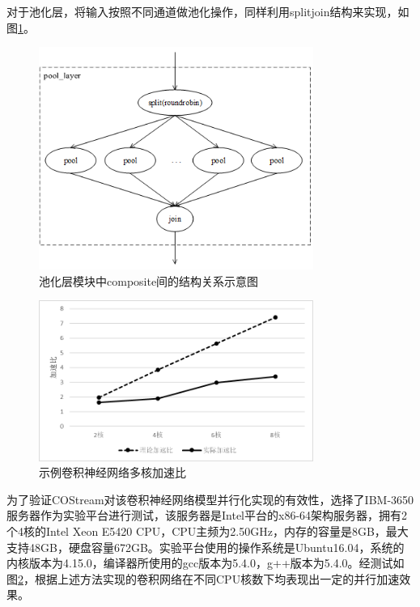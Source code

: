 对于池化层，将输入按照不同通道做池化操作，同样利用splitjoin结构来实现，如图\ref{fig:cnn_pooling_layer}。

\begin{figure}[!t]
\centering
\includegraphics[width=0.8\textwidth]{../img/Chap_Application/Yu/cnn_pooling_layer.png}
\caption{池化层模块中composite间的结构关系示意图}
\label{fig:cnn_pooling_layer}
\end{figure}

\begin{figure}[!t]
  \centering
  \includegraphics[width=0.8\textwidth]{../img/Chap_Application/Yu/cnn_speedup.png}
  \caption{示例卷积神经网络多核加速比}
  \label{fig:cnn_speedup}
\end{figure}

为了验证COStream对该卷积神经网络模型并行化实现的有效性，选择了IBM-3650服务器作为实验平台进行测试，该服务器是Intel平台的x86-64架构服务器，拥有2个4核的Intel Xeon E5420 CPU，CPU主频为2.50GHz，内存的容量是8GB，最大支持48GB，硬盘容量672GB。实验平台使用的操作系统是Ubuntu16.04，系统的内核版本为4.15.0，编译器所使用的gcc版本为5.4.0，g++版本为5.4.0。经测试如图\ref{fig:cnn_speedup}，根据上述方法实现的卷积网络在不同CPU核数下均表现出一定的并行加速效果。


